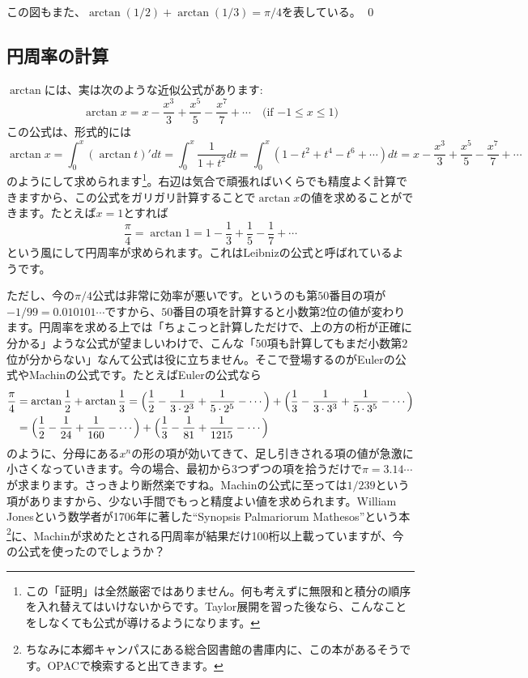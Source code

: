 この図もまた、$\arctan (1/2) + \arctan (1/3) = \pi/4$を表している。 \qed

\subsection{円周率の計算}

$\arctan$には、実は次のような近似公式があります:
\[
\arctan x = x - \frac{x^3}{3} + \frac{x^5}{5} - \frac{x^7}{7} + \cdots \quad \text{(if $-1\leq x\leq 1$)}
\]
この公式は、形式的には
\[
\arctan x = \int_0^x (\arctan t)' dt = \int_0^x \frac{1}{1+t^2} dt = \int_0^x (1-t^2+t^4-t^6+\cdots) dt
= x - \frac{x^3}{3} + \frac{x^5}{5} - \frac{x^7}{7} + \cdots
\]
のようにして求められます\footnote{この「証明」は全然厳密ではありません。何も考えずに無限和と積分の順序を入れ替えてはいけないからです。Taylor展開を習った後なら、こんなことをしなくても公式が導けるようになります。}。右辺は気合で頑張ればいくらでも精度よく計算できますから、この公式をガリガリ計算することで$\arctan x$の値を求めることができます。たとえば$x=1$とすれば
\[
\frac{\pi}{4} = \arctan 1 = 1 - \frac{1}{3} + \frac{1}{5} - \frac{1}{7} + \cdots
\]
という風にして円周率が求められます。これはLeibnizの公式と呼ばれているようです。

ただし、今の$\pi/4$公式は非常に効率が悪いです。というのも第$50$番目の項が$-1/99 = 0.010101\cdots$ですから、$50$番目の項を計算すると小数第$2$位の値が変わります。円周率を求める上では「ちょこっと計算しただけで、上の方の桁が正確に分かる」ような公式が望ましいわけで、こんな「$50$項も計算してもまだ小数第$2$位が分からない」なんて公式は役に立ちません。そこで登場するのがEulerの公式やMachinの公式です。たとえばEulerの公式なら
\begin{align*}
\frac{\pi}{4}
&= \arctan \frac{1}{2} + \arctan \frac{1}{3}
= \Bigl(\frac{1}{2} - \frac{1}{3\cdot 2^3} + \frac{1}{5\cdot 2^5} - \cdots\Bigr)
+ \Bigl(\frac{1}{3} - \frac{1}{3\cdot 3^3} + \frac{1}{5\cdot 3^5} - \cdots\Bigr) \\
&= \Bigl(\frac{1}{2} - \frac{1}{24} + \frac{1}{160} - \cdots\Bigr)
+ \Bigl(\frac{1}{3} - \frac{1}{81} + \frac{1}{1215} - \cdots\Bigr)
\end{align*}
のように、分母にある$x^n$の形の項が効いてきて、足し引きされる項の値が急激に小さくなっていきます。今の場合、最初から$3$つずつの項を拾うだけで$\pi=3.14\cdots$が求まります。さっきより断然楽ですね。Machinの公式に至っては$1/239$という項がありますから、少ない手間でもっと精度よい値を求められます。William Jonesという数学者が1706年に著した``Synopsis Palmariorum Mathesos''という本\footnote{ちなみに本郷キャンパスにある総合図書館の書庫内に、この本があるそうです。OPACで検索すると出てきます。}に、Machinが求めたとされる円周率が結果だけ100桁以上載っていますが、今の公式を使ったのでしょうか？

